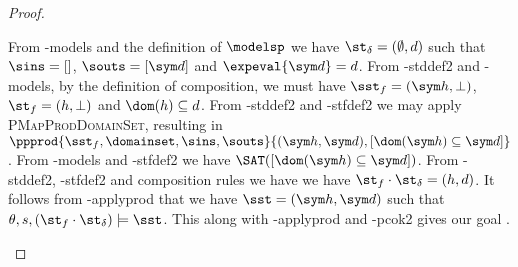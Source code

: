 \begin{proof}
\pfcase{$\delta = \domainset$}

\begin{hypvlist}
 From \hyp{models} and the definition of $\modelsp$ we have $\st_\delta=(\emptyset,d)$ such that $\sins=[]$, $\souts=[\sym d]$ and $\expeval{\sym d}=d$.
 From \hyp{stddef2} and \hyp{models}, by the definition of composition, we must have $\sst_f=(\sym h,\bot)$, $\st_f=(h,\bot)$ and $\dom(h)\subseteq d$.
 From \hyp{stddef2} and \hyp{stfdef2} we may apply \textsc{PMapProdDomainSet}, resulting in $\\\ppprod{\sst_f,\domainset,\sins,\souts}{(\sym h, \sym d), [\dom(\sym h)\subseteq \sym d]}$.
 From \hyp{models} and \hyp{stfdef2} we have $\SAT([\dom(\sym h)\subseteq \sym d])$.
 From \hyp{stddef2}, \hyp{stfdef2} and composition rules we have we have $\st_f\cdot\st_\delta=(h,d)$. It follows from \hyp{applyprod} that we have $\sst=(\sym h,\sym d)$ such that $\theta,s,(\st_f\cdot\st_\delta)\models\sst$. This along with \hyp{applyprod} and \hyp{pcok2} gives our goal .
\end{hypvlist}

\end{proof}

